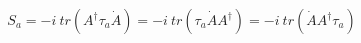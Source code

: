 \begin{equation}
S_a = -i~tr(A^\dag \tau_a \dot{A})=-i~tr(\tau_a \dot{A} A^\dag)=-i~tr(\dot{A} A^\dag \tau_a)
\end{equation}

